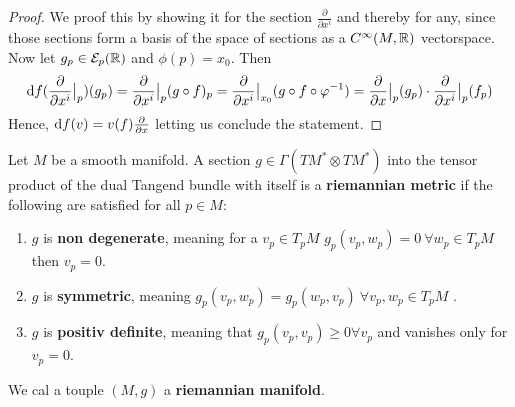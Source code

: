 \begin{proof}
	We proof this by showing it for the section $\frac{\partial}{\partial x^i}$ and thereby for any, since those sections form a basis of the space of sections as a $C^{\infty}(M,\mathbb{R})$ vectorspace. Now let $g_p\in \mathcal{E}_p(\mathbb{R})$ and $\phi(p)=x_0$. Then
	\begin{align*}
		\mathop{}\!\mathrm{d} f(\frac{\partial }{\partial x^i}\big|_p)(g_p)= \frac{\partial }{\partial x^i}\big|_p (g\circ f)_p=\frac{\partial }{\partial x^i}\big|_{x_0}(g\circ f\circ \varphi^{-1})=\frac{\partial }{\partial x}\big|_{p}(g_p) \cdot \frac{\partial }{\partial x^i}\big|_p(f_p)
	\end{align*}
	Hence, $\mathop{}\!\mathrm{d} f (v)=v(f)\frac{\partial }{\partial x}$ letting us conclude the statement.
\end{proof}
\begin{definition}[A Metric]
	Let $M$ be a smooth manifold.
	A section $g\in \Gamma(TM^*\otimes TM^*)$ into the tensor product of the dual Tangend bundle with itself is a\textbf{ riemannian metric} if the following are satisfied for all $p\in M$:
	\begin{enumerate}
		\item $g$ is \textbf{non degenerate}, meaning for a $v_p\in T_pM$ $g_p(v_p,w_p)=0 ~\forall w_p\in T_pM$ then $v_p=0$.
		\item $g$ is \textbf{symmetric}, meaning $g_p(v_p,w_p)=g_p(w_p,v_p)~\forall v_p,w_p\in T_pM$ .
		\item $g$ is \textbf{positiv definite}, meaning that $g_p(v_p,v_p)\geq 0 \forall v_p$ and vanishes only for $v_p=0$.
	\end{enumerate} We cal a touple $(M,g)$ a \textbf{riemannian manifold}.
\end{definition}
	
